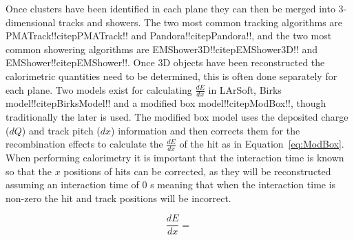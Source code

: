 Once clusters have been identified in each plane they can then be merged into 3-dimensional tracks and showers. The two most common tracking algorithms are PMATrack!!citep{PMATrack}!! and Pandora!!citep{Pandora}!!, and the two most common showering algorithms are EMShower3D!!citep{EMShower3D}!! and EMShower!!citep{EMShower}!!. Once 3D objects have been reconstructed the calorimetric quantities need to be determined, this is often done separately for each plane. Two models exist for calculating $\frac{dE}{dx}$ in LArSoft, Birks model!!citep{BirksModel}!! and a modified box model!!citep{ModBox}!!, though traditionally the later is used. The modified box model uses the deposited charge ($dQ$) and track pitch ($dx$) information and then corrects them for the recombination effects to calculate the $\frac{dE}{dx}$ of the hit as in Equation~\ref{eq:ModBox}. When performing calorimetry it is important that the interaction time is known so that the $x$ positions of hits can be corrected, as they will be reconstructed assuming an interaction time of 0 s meaning that when the interaction time is non-zero the hit and track positions will be incorrect. 

\begin{equation} \label{eq:ModBox}
  \frac{dE}{dx} = 
\end{equation}
